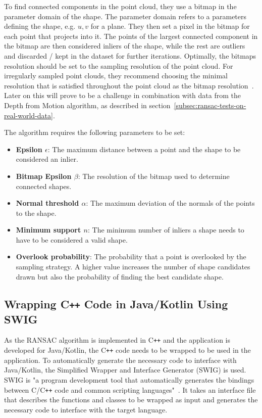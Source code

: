 To find connected components in the point cloud, they use a bitmap in the parameter domain of the shape.
The parameter domain refers to a parameters defining the shape, e.g. $u, v$ for a plane.
They then set a pixel in the bitmap for each point that projects into it.
The points of the largest connected component in the bitmap are then considered inliers of the shape,
while the rest are outliers and discarded / kept in the dataset for further iterations.
Optimally, the bitmaps resolution should be set to the sampling resolution of the point cloud.
For irregularly sampled point clouds, they recommend choosing the minimal resolution that is satisfied throughout the point cloud as the bitmap resolution~\cite{schnabel_efficient_2007}.
Later on this will prove to be a challenge in combination with data from the Depth from Motion algorithm, as described in section~\ref{subsec:ransac-tests-on-real-world-data}.

The algorithm requires the following parameters to be set:
\begin{itemize}
    \item \textbf{Epsilon $\epsilon$}: The maximum distance between a point and the shape to be considered an inlier.
    \item \textbf{Bitmap Epsilon $\beta$}: The resolution of the bitmap used to determine connected shapes.
    \item \textbf{Normal threshold $\alpha$}: The maximum deviation of the normals of the points to the shape.
    \item \textbf{Minimum support $n$}: The minimum number of inliers a shape needs to have to be considered a valid shape.
    \item \textbf{Overlook probability}: The probability that a point is overlooked by the sampling strategy. A higher value increases the number of shape candidates drawn but also the probability of finding the best candidate shape.
\end{itemize}

\subsection{Wrapping C\texttt{++} Code in Java/Kotlin Using SWIG}
As the RANSAC algorithm is implemented in C\texttt{++} and the application is developed for Java/Kotlin,
the C\texttt{++} code needs to be wrapped to be used in the application.
To automatically generate the necessary code to interface with Java/Kotlin,
the Simplified Wrapper and Interface Generator (SWIG) is used.
SWIG is "a program development tool that automatically generates the bindings between C/C\texttt{++}
code and common scripting languages"~\parencite{beazley_swig_1996}.
It takes an interface file that describes the functions and classes to be wrapped as input and generates the
necessary code to interface with the target language.

